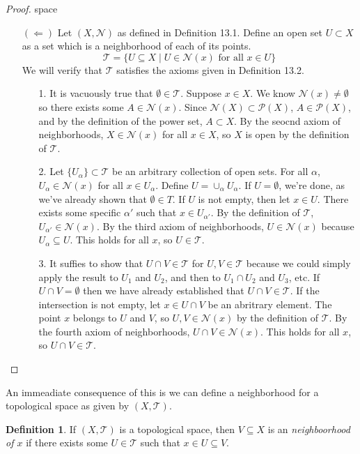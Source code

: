 \documentclass{article}
\newcommand{\T}{\mathcal{T}}
\theoremstyle{definition}
\newtheorem{definition}{Definition}[section]
\begin{document}
\begin{proof}{\color{white}space}
\begin{enumerate}
			\item [$ (\Longleftarrow) $] Let $(X,\mathcal N)$ as defined in Definition 13.1. Define an open set $U \subset X$ as a set which is a neighborhood of each of its points.
			$$\mathcal T=\{U\subseteq X\mid U\in \mathcal N(x)\text{ for all }x\in U\}$$ We will verify that $\mathcal T$ satisfies the axioms given in Definition 13.2.
			\begin{enumerate}
				\item[1.] It is vacuously true that $\emptyset \in \T$. Suppose $x\in X$. We know $\mathcal N(x)\neq\emptyset$ so there exists some $A\in \mathcal N(x) $. Since $\mathcal N(X)\subset \mathcal P(X)$, $A\in \mathcal P(X)$, and by the definition of the power set, $A\subset X$. By the seocnd axiom of neighborhoods, $X\in \mathcal N(x)$ for all $x\in X$, so $X$ is open by the definition of $\mathcal T$.
				\item[2.] Let $\{U_\alpha\}\subset \T$ be an arbitrary collection of open sets. For all $\alpha$, $U_\alpha \in \mathcal N(x)$ for all $x\in U_\alpha$. Define $U = \cup_\alpha U_\alpha$. If $U=\emptyset$, we're done, as we've already shown that $\emptyset \in T$. If $U$ is not empty, then let $x\in U$. There exists some specific $\alpha'$ such that $x\in U_{\alpha'}$. By the definition of $\mathcal T$, $U_{\alpha'}\in \mathcal N(x)$. By the third axiom of neighborhoods, $U\in \mathcal N(x)$ because $U_\alpha\subseteq U$. This holds for all $x$, so $U\in \T$.  
				\item[3.] It suffies to show that $U\cap V\in\mathcal T$ for $U,V\in\T$ because we could simply apply the result to $U_1$ and $U_2$, and then to $U_1\cap U_2$ and $U_3$, etc. If $U\cap V=\emptyset$ then we have already established that $U\cap V\in \T$. If the intersection is not empty, let $x\in U\cap V$ be an abritrary element. The point $x$ belongs to $U$ and $V$, so $U,V\in\mathcal N(x)$ by the definition of $\mathcal T$. By the fourth axiom of neighborhoods, $U\cap V\in\mathcal N(x)$. This holds for all $x$, so $U\cap V\in\mathcal T$.
			\end{enumerate}
		\end{enumerate}
	\end{proof}
	
	An immeadiate consequence of this is we can define a neighborhood for a topological space as given by $(X,\T)$.
	
	\begin{definition}\label{def}
		If $(X,\T)$ is a topological space, then $V\subseteq X$ is an \textit{\color{red}neighboorhood of $x$} if there exists some $U\in \T$ such that $x\in U\subseteq V$.
	\end{definition}
	
\end{document}
